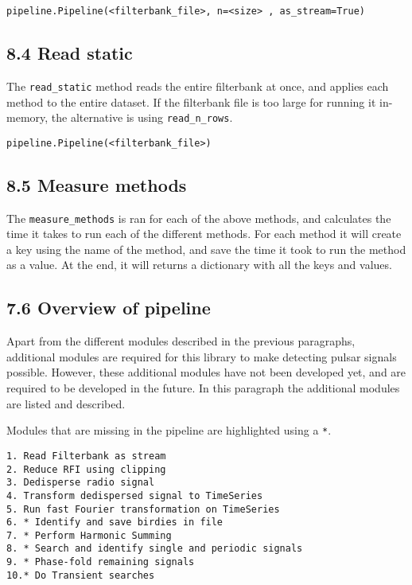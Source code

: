\documentclass[]{article}
\begin{document}
\begin{verbatim}
pipeline.Pipeline(<filterbank_file>, n=<size> , as_stream=True)
\end{verbatim}

\subsection{8.4 Read static}\label{read-static}

The \texttt{read\_static} method reads the entire filterbank at once,
and applies each method to the entire dataset. If the filterbank file is
too large for running it in-memory, the alternative is using
\texttt{read\_n\_rows}.

\begin{verbatim}
pipeline.Pipeline(<filterbank_file>)
\end{verbatim}

\subsection{8.5 Measure methods}\label{measure-methods}

The \texttt{measure\_methods} is ran for each of the above methods, and
calculates the time it takes to run each of the different methods. For
each method it will create a key using the name of the method, and save
the time it took to run the method as a value. At the end, it will
returns a dictionary with all the keys and values.

\subsection{7.6 Overview of pipeline}\label{overview-of-pipeline}

Apart from the different modules described in the previous paragraphs,
additional modules are required for this library to make detecting
pulsar signals possible. However, these additional modules have not been
developed yet, and are required to be developed in the future. In this
paragraph the additional modules are listed and described.

Modules that are missing in the pipeline are highlighted using a
\texttt{*}.

\begin{verbatim}
1. Read Filterbank as stream
2. Reduce RFI using clipping
3. Dedisperse radio signal
4. Transform dedispersed signal to TimeSeries
5. Run fast Fourier transformation on TimeSeries
6. * Identify and save birdies in file
7. * Perform Harmonic Summing
8. * Search and identify single and periodic signals
9. * Phase-fold remaining signals
10.* Do Transient searches
\end{verbatim}
\end{document}
